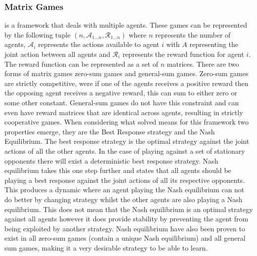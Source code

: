 \documentclass[conference]{IEEEtran}
\begin{document}
\subsubsection{Matrix Games} is a framework that deals with multiple agents. These games can be represented by the following tuple $(n, \mathcal{A}_{1...n}, \mathcal{R}_{1...n})$ where $n$ represents the number of agents, $\mathcal{A}_{i}$ represents the actions available to agent $i$ with $A$ representing the joint action between all agents and $\mathcal{R}_{i}$ represents the reward function for agent $i$. The reward function can be represented as a set of $n$ matrices. There are two forms of matrix games zero-sum games and general-sum games. Zero-sum games are strictly competitive, were if one of the agents receives a positive reward then the opposing agent receives a negative reward, this can sum to either zero or some other constant. General-sum games do not have this constraint and can even have reward matrices that are identical across agents, resulting in strictly cooperative games. When considering what solved means for this framework two properties emerge, they are the Best Response strategy and the Nash Equilibrium. The best response strategy is the optimal strategy against the joint actions of all the other agents. In the case of playing against a set of stationary opponents there will exist a deterministic best response strategy. Nash equilibrium takes this one step further and states that all agents should be playing a best response against the joint actions of all its respective opponents. This produces a dynamic where an agent playing the Nash equilibrium can not do better by changing strategy whilst the other agents are also playing a Nash equilibrium. This does not mean that the Nash equilibrium is an optimal strategy against all agents however it does provide stability by preventing the agent from being exploited by another strategy. Nash equilibrium have also been proven to exist in all zero-sum games (contain a unique Nash equilibrium) and all general sum games, making it a very desirable strategy to be able to learn.
\end{document}
